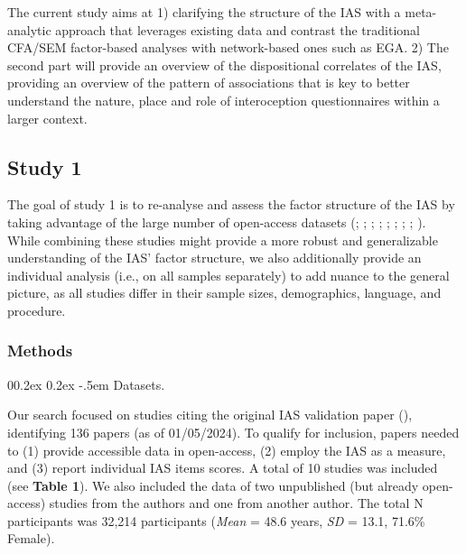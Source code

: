 \documentclass[
  man,
  floatsintext,
  longtable,
  nolmodern,
  notxfonts,
  notimes,
  colorlinks=true,linkcolor=blue,citecolor=blue,urlcolor=blue]{apa7}
\makeatletter
\renewcommand{\paragraph}{\@startsection{paragraph}{4}{\parindent}%
	{0\baselineskip \@plus 0.2ex \@minus 0.2ex}%
	{-.5em}%
	{\normalfont\normalsize\bfseries\typesectitle}}
\makeatother
\begin{document}
The current study aims at 1) clarifying the structure of the IAS with a
meta-analytic approach that leverages existing data and contrast the
traditional CFA/SEM factor-based analyses with network-based ones such
as EGA. 2) The second part will provide an overview of the dispositional
correlates of the IAS, providing an overview of the pattern of
associations that is key to better understand the nature, place and role
of interoception questionnaires within a larger context.

\subsection{Study 1}\label{study-1}

The goal of study 1 is to re-analyse and assess the factor structure of
the IAS by taking advantage of the large number of open-access datasets
(;
;
;
;
;
;
;
; ). While combining these studies might provide a more
robust and generalizable understanding of the IAS' factor structure, we
also additionally provide an individual analysis (i.e., on all samples
separately) to add nuance to the general picture, as all studies differ
in their sample sizes, demographics, language, and procedure.

\subsubsection{Methods}\label{methods}

\paragraph{Datasets.}\label{datasets}

Our search focused on studies citing the original IAS validation paper
(), identifying 136 papers
(as of 01/05/2024). To qualify for inclusion, papers needed to (1)
provide accessible data in open-access, (2) employ the IAS as a measure,
and (3) report individual IAS items scores. A total of 10 studies was
included (see \textbf{Table 1}). We also included the data of two
unpublished (but already open-access) studies from the authors and one
from another author. The total N participants was 32,214 participants
(\emph{Mean} = 48.6 years, \emph{SD} = 13.1, 71.6\% Female).
\end{document}
